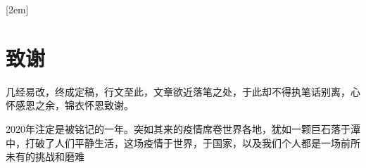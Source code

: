 
[2em]{\vspace{.5\baselineskip}\xiaosan\song}
             {\prechaptername\CJKnumber{\thecontentslabel}\postchaptername\qquad}{} 
             {}                            %
\lhead{}
\rhead{}
\lfoot{}
\cfoot{}
\rfoot{}
\chapter*{致\quad 谢}
\setcounter{page}{1}

几经易改，终成定稿，行文至此，文章欲近落笔之处，于此却不得执笔话别离，心怀感恩之余，锦衣怀恩致谢。

2020年注定是被铭记的一年。突如其来的疫情席卷世界各地，犹如一颗巨石落于潭中，打破了人们平静生活，这场疫情于世界，于国家，以及我们个人都是一场前所未有的挑战和磨难

